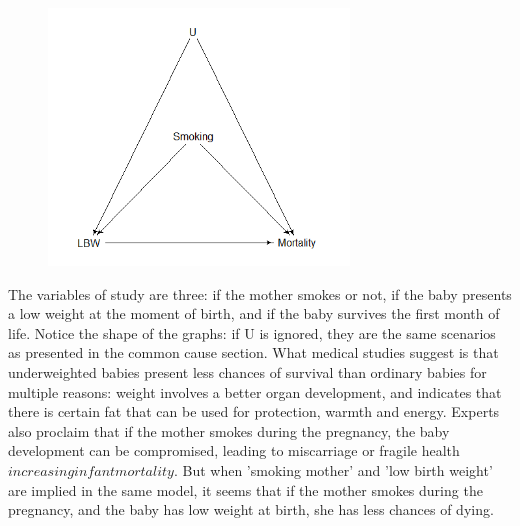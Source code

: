 \documentclass{article}
\begin{document}
\begin{figure}[h]
\includegraphics[width=8cm]{LBW2DAG.png}
\centering
\end{figure}
\newpage
The variables of study are three: if the mother smokes or not, if the baby presents a low weight at the moment of birth, and if the baby survives the first month of life. Notice the shape of the graphs: if U is ignored, they are the same scenarios as presented in the common cause section. What medical studies suggest is that underweighted babies present less chances of survival than ordinary babies for multiple reasons: weight involves a better organ development, and indicates that there is certain fat that can be used for protection, warmth and energy. Experts also proclaim that if the mother smokes during the pregnancy, the baby development can be compromised, leading to miscarriage or fragile health \(increasing infant mortality\). But when 'smoking mother' and 'low birth weight' are implied in the same model, it seems that if the mother smokes during the pregnancy, and the baby has low weight at birth, she has less chances of dying. 
\end{document}

